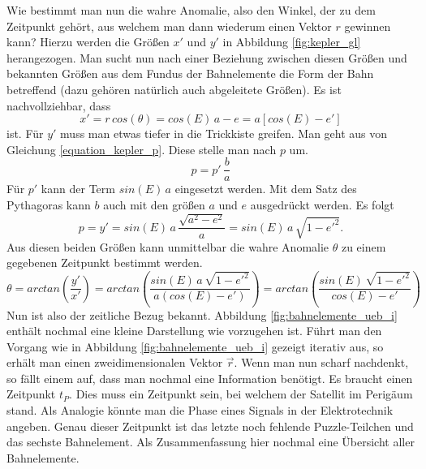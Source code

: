 \newpar
Wie bestimmt man nun die wahre Anomalie, also den Winkel, der zu dem Zeitpunkt gehört, aus welchem man dann wiederum einen Vektor \ensuremath{r} gewinnen kann? Hierzu werden die Größen \ensuremath{x'} und \ensuremath{y'} in Abbildung \ref{fig:kepler_gl} herangezogen. Man sucht nun nach einer Beziehung zwischen diesen Größen und bekannten Größen aus dem Fundus der Bahnelemente die Form der Bahn betreffend (dazu gehören natürlich auch abgeleitete Größen). 
Es ist nachvollziehbar, dass 
\begin{equation}
	x'=r\,cos(\theta)=cos(E)\,a-e=a\left[cos(E)-e'\right]
\end{equation}
ist. Für \ensuremath{y'} muss man etwas tiefer in die Trickkiste greifen. Man geht aus von Gleichung \ref{equation_kepler_p}. Diese stelle man nach \ensuremath{p} um.
\begin{equation}
	p=p'\,\frac{b}{a}
\end{equation} 
Für \ensuremath{p'} kann der Term \ensuremath{sin(E)\,a} eingesetzt werden. Mit dem Satz des Pythagoras kann \ensuremath{b} auch mit den größen \ensuremath{a} und \ensuremath{e} ausgedrückt werden. Es folgt  
\begin{equation}
	p=y'=sin(E)\,a\,\frac{\sqrt{a^2-e^2}}{a}=sin(E)\,a\,\sqrt{1-e'^2}.
\end{equation} 
Aus diesen beiden Größen kann unmittelbar die wahre Anomalie \ensuremath{\theta} zu einem gegebenen Zeitpunkt bestimmt werden.
\begin{equation}
	\theta=arctan\left(\frac{y'}{x'}\right)=arctan\left(\frac{sin(E)\,a\,\sqrt{1-e'^2}}{a\left(cos(E)-e'\right)}\right)=arctan\left(\frac{sin(E)\,\sqrt{1-e'^2}}{cos(E)-e'}\right)
\end{equation}
\newpar
Nun ist also der zeitliche Bezug bekannt. Abbildung \ref{fig:bahnelemente_ueb_i} enthält nochmal eine kleine Darstellung wie vorzugehen ist.
Führt man den Vorgang wie in Abbildung \ref{fig:bahnelemente_ueb_i} gezeigt iterativ aus, so erhält man einen zweidimensionalen Vektor \ensuremath{\vec{r}}. Wenn man nun scharf nachdenkt, so fällt einem auf, dass man nochmal eine Information benötigt. Es braucht einen Zeitpunkt \ensuremath{t_P}. Dies muss ein Zeitpunkt sein, bei welchem der Satellit im Perigäum stand. Als Analogie könnte man die Phase eines Signals in der Elektrotechnik angeben. Genau dieser Zeitpunkt ist das letzte noch fehlende Puzzle-Teilchen und das sechste Bahnelement.
\newpar
Als Zusammenfassung hier nochmal eine Übersicht aller Bahnelemente. 
